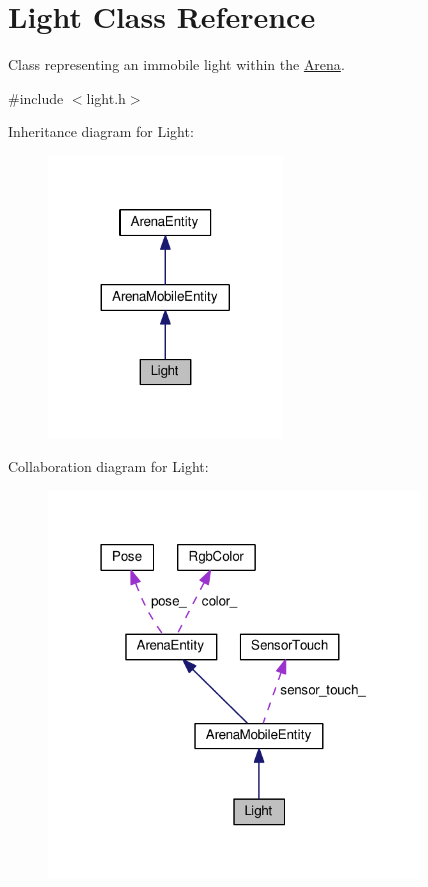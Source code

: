 \hypertarget{classLight}{}\section{Light Class Reference}
\label{classLight}


Class representing an immobile light within the \hyperlink{classArena}{Arena}.  




{\ttfamily \#include $<$light.\+h$>$}



Inheritance diagram for Light\+:\nopagebreak
\begin{figure}[H]
\begin{center}
\leavevmode
\includegraphics[width=176pt]{classLight__inherit__graph}
\end{center}
\end{figure}


Collaboration diagram for Light\+:\nopagebreak
\begin{figure}[H]
\begin{center}
\leavevmode
\includegraphics[width=279pt]{classLight__coll__graph}
\end{center}
\end{figure}
